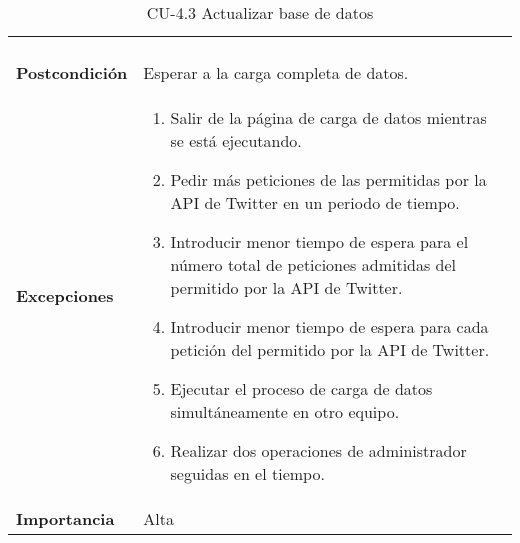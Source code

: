 \begin{table}[h!]
\begin{tabularx}{\linewidth}{ p{} p{} }
\begin{enumerate}
		\end{enumerate}\\
		\textbf{Postcondición}     &   Esperar a la carga completa de datos. \\
		\textbf{Excepciones}          & 
        \begin{enumerate}
            \def\labelenumi{\arabic{enumi}.}
            \tightlist
            \item Salir de la página de carga de datos mientras se está ejecutando.
            \item Pedir más peticiones de las permitidas por la API de Twitter en un periodo de tiempo.
            \item Introducir menor tiempo de espera para el número total de peticiones admitidas del permitido por la API de Twitter.
            \item Introducir menor tiempo de espera para cada petición del permitido por la API de Twitter.
            \item Ejecutar el proceso de carga de datos simultáneamente en otro equipo.
            \item Realizar dos operaciones de administrador seguidas en el tiempo.
		\end{enumerate}\\
		\textbf{Importancia}          & Alta \\
		\bottomrule
	\end{tabularx}
	\caption{CU-4.3 Actualizar base de datos}
\end{table}

